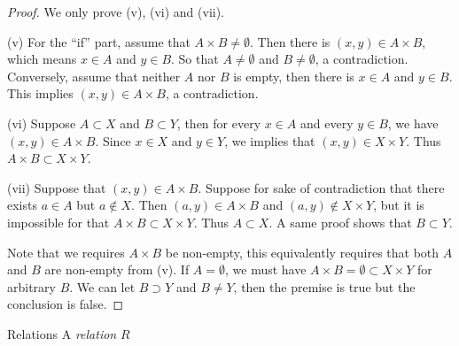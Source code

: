 \begin{proof}
    We only prove (v), (vi) and (vii).

    (v) For the ``if'' part, assume that $A \times B \neq \emptyset$. Then there is $(x, y) \in A \times B$, which means $x \in A$ and $y \in B$. So that $A \neq \emptyset$ and $B \neq \emptyset$, a contradiction. Conversely, assume that neither $A$ nor $B$ is empty, then there is $x \in A$ and $y \in B$. This implies $(x, y) \in A \times B$, a contradiction.

    (vi) Suppose $A \subset X$ and $B \subset Y$, then for every $x \in A$ and every $y \in B$, we have $(x, y) \in A \times B$. Since $x \in X$ and $y \in Y$, we implies that $(x, y) \in X \times Y$. Thus $A \times B \subset X \times Y$.

    (vii) Suppose that $(x, y) \in A \times B$. Suppose for sake of contradiction that there exists $a \in A$ but $a \notin X$. Then $(a, y) \in A \times B$ and $(a, y) \notin X \times Y$, but it is impossible for that $A \times B \subset X \times Y$. Thus $A \subset X$. A same proof shows that $B \subset Y$.

    Note that we requires $A \times B$ be non-empty, this equivalently requires that both $A$ and $B$ are non-empty from (v). If $A = \emptyset$, we must have $A \times B = \emptyset \subset X \times Y$ for arbitrary $B$. We can let $B \supset Y$ and $B \neq Y$, then the premise is true but the conclusion is false.
\end{proof}

\begin{definition}{Relations}
    A \emph{relation} $R$
\end{definition}



